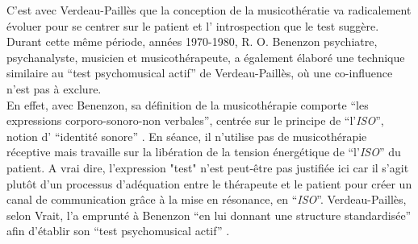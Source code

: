 C'est avec Verdeau-Paillès que la conception de la musicothératie va radicalement évoluer pour se 
centrer sur le patient et l' introspection que le test suggère.
Durant cette même période, années 1970-1980,
 R. O. Benenzon psychiatre, psychanalyste,
musicien et musicothérapeute, a également élaboré une technique similaire au \enquote {test 
psychomusical actif} de Verdeau-Paillès,
 où une co-influence n'est pas à exclure.
 \\
 En effet, avec Benenzon, sa définition de la musicothérapie comporte
\enquote{les expressions corporo-sonoro-non
     verbales}, %
centrée sur le principe de \enquote{l'\textit{ISO}}, notion
 d' \enquote{identité sonore} \autocite{benenzon:musicotherapie}.
En séance, il n'utilise pas de
 musicothérapie réceptive mais travaille sur la libération de
 la tension énergétique de \enquote{l'\textit{ISO}} du patient.
A vrai dire, l'expression "test" n'est peut-être pas justifiée ici car il s'agit plutôt d'un processus 
d'adéquation entre le thérapeute et le patient pour créer un canal de communication grâce à la mise en 
résonance, en \enquote{\textit{ISO}}. Verdeau-Paillès, selon Vrait, l'a emprunté à Benenzon  \enquote {en 
lui donnant une structure standardisée} afin d'établir son \enquote {test psychomusical actif} 
\autocite[39]{vrait_musicotherapie_2018}.%

